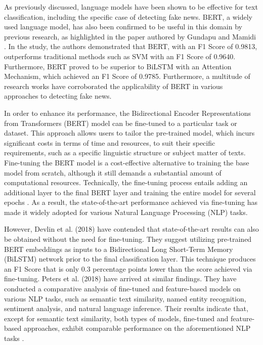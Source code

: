 As previously discussed, language models have been shown to be effective for text classification, including the specific case of detecting fake news. BERT, a widely used language model, has also been confirmed to be useful in this domain by previous research, as highlighted in the paper authored by Gundapu and Mamidi \autocite{Gundapu2021}. In the study, the authors demonstrated that BERT, with an F1 Score of 0.9813, outperforms traditional methods such as SVM with an F1 Score of 0.9640. Furthermore, BERT proved to be superior to BiLSTM with an Attention Mechanism, which achieved an F1 Score of 0.9785.
Furthermore, a multitude of research works \autocite{Alonso-Bartolome2021, Wang2021, Singhal2019, Aljawarneh2022, Jwa2019, Yang2019} have corroborated the applicability of BERT in various approaches to detecting fake news.

In order to enhance its performance, the Bidirectional Encoder Representations from Transformers (BERT) model can be fine-tuned to a particular task or dataset. This approach allows users to tailor the pre-trained model, which incurs significant costs in terms of time and resources, to suit their specific requirements, such as a specific linguistic structure or subject matter of texts. Fine-tuning the BERT model is a cost-effective alternative to training the base model from scratch, although it still demands a substantial amount of computational resources. Technically, the fine-tuning process entails adding an additional layer to the final BERT layer and training the entire model for several epochs \autocite{Devlin2018}. As a result, the state-of-the-art performance achieved via fine-tuning has made it widely adopted for various Natural Language Processing (NLP) tasks.

However, Devlin et al. (2018) have contended that state-of-the-art results can also be obtained without the need for fine-tuning. They suggest utilizing pre-trained BERT embeddings as inputs to a Bidirectional Long Short-Term Memory (BiLSTM) network prior to the final classification layer. This technique produces an F1 Score that is only 0.3 percentage points lower than the score achieved via fine-tuning. Peters et al. (2018) have arrived at similar findings. They have conducted a comparative analysis of fine-tuned and feature-based models on various NLP tasks, such as semantic text similarity, named entity recognition, sentiment analysis, and natural language inference. Their results indicate that, except for semantic text similarity, both types of models, fine-tuned and feature-based approaches, exhibit comparable performance on the aforementioned NLP tasks \autocite{Peters2019}.

